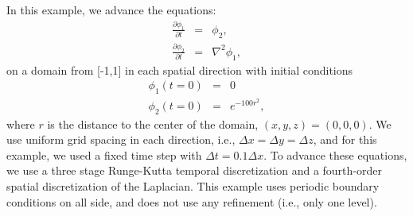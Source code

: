 In this example, we advance the equations:
\begin{eqnarray}
\frac{\partial\phi_1}{\partial t} &=& \phi_2, \\
\frac{\partial\phi_2}{\partial t} &=& \nabla^2\phi_1,
\end{eqnarray}
on a domain from [-1,1] in each spatial direction with initial conditions
\begin{eqnarray}
\phi_1(t=0) &=& 0 \\
\phi_2(t=0) &=& e^{-100r^2},
\end{eqnarray}
where $r$ is the distance to the center of the domain, $(x,y,z) = (0,0,0)$.
We use uniform grid spacing in each direction, i.e., $\Delta x = \Delta y = \Delta z$,
and for this example, we used a fixed time step with $\Delta t = 0.1\Delta x$.
To advance these equations, we use a three stage Runge-Kutta temporal discretization and a 
fourth-order spatial discretization of the Laplacian.  This example uses periodic
boundary conditions on all side, and does not use any refinement (i.e., only one level).\\

